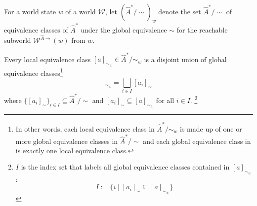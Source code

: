 For a world state $w$ of a world $\mathscr{W}$, let $(\hat{A}^{*}/\sim)_{w}$ denote the set $\hat{A}^{*}/\sim$ of equivalence classes of $\hat{A}^{*}$ under the global equivalence $\sim$ for the reachable subworld $\mathscr{W}^{\hat{A}\to}(w)$ from $w$.


\begin{propositionE}\label{prp:local_class_is_disjoint_union_of_global_classes}
    Every local equivalence class $[a]_{\sim_{w}} \in \hat{A}^{*}/\sim_{w}$ is a disjoint union of global equivalence classes\footnote{
    In other words, each local equivalence class in $\hat{A}^{*}/\sim_{w}$ is made up of one or more global equivalence classes in $\hat{A}^{*}/\sim$ and each global equivalence class in is exactly one local equivalence class.
    }
    \begin{equation}
        [a]_{\sim_{w}} = \bigsqcup_{i \in I}[a_{i}]_{\sim}
    \end{equation}
    where $\{ [a_{i}]_{\sim} \}_{i \in I} \subseteq \hat{A}^{*}/\sim$ and $[a_{i}]_{\sim} \subseteq [a]_{\sim_{w}}$ for all $i \in I$.
    \footnote{
    $I$ is the index set that labels all global equivalence classes contained in $[a]_{\sim_{w}}$:
    \begin{equation}
        I := \{ i \mid [a_{i}]_{\sim} \subseteq [a]_{\sim_{w}} \}
    \end{equation}
    }
\end{propositionE}
